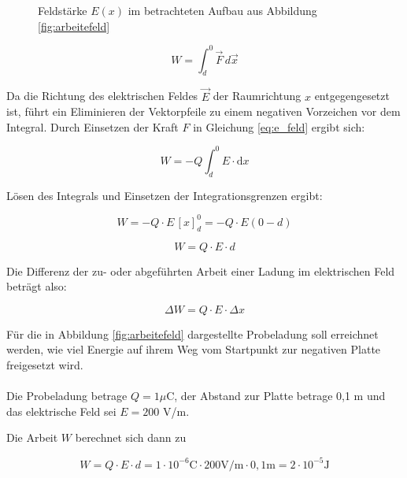 \begin{frame}
{	\begin{figure}[h!]
		\centering
		
		\caption{Feldstärke $E(x)$ im betrachteten Aufbau aus Abbildung \ref{fig:arbeitefeld}}
		\label{fig:evsx}
	\end{figure}



		
\begin{equation*}
	W = \int_{d}^{0}  \vec{F} \, d \vec{x} 
\end{equation*}

Da die Richtung des elektrischen Feldes $\vec{E}$ der Raumrichtung $x$ 
entgegengesetzt ist, führt ein Eliminieren der Vektorpfeile zu einem negativen Vorzeichen vor dem Integral.
Durch Einsetzen der Kraft $F$ in Gleichung \ref{eq:e_feld} ergibt sich:

\begin{equation*}
	W = - Q \int_{d}^{0} E \cdot \mathrm{d}x 
\end{equation*}

Lösen des Integrals und Einsetzen der Integrationsgrenzen ergibt:

\begin{equation*}
	 W = -Q \cdot E \, [x]_d^0 = -Q \cdot E (0-d) 
\end{equation*} 

\begin{equation*}
	 W = Q \cdot E \cdot d
\end{equation*}

Die Differenz der zu- oder abgeführten Arbeit einer Ladung im elektrischen Feld beträgt also:

\begin{equation}
	\Delta W = Q \cdot E \cdot \Delta x 
\end{equation}

\begin{bsp}{}{}

	Für die in Abbildung \ref{fig:arbeitefeld} dargestellte Probeladung soll erreichnet werden, wie viel Energie auf ihrem Weg vom
    Startpunkt zur negativen Platte freigesetzt wird.\\
\phantom{text}\\

	Die Probeladung betrage $Q= 1 \mu \mathrm{C}$, der Abstand zur Platte betrage 0,1 m und das 
	elektrische Feld sei $E= 200$ V/m.

	Die Arbeit $W$ berechnet sich dann zu 

	\begin{equation*}
		W= Q \cdot E \cdot d = 1 \cdot 10^{-6} \mathrm{C} \cdot 200 \mathrm{V/m} \cdot 0,1 \mathrm{m} = 2 \cdot 10^{-5} \mathrm{J} 
	\end{equation*}
\end{bsp}

}
\end{frame}
